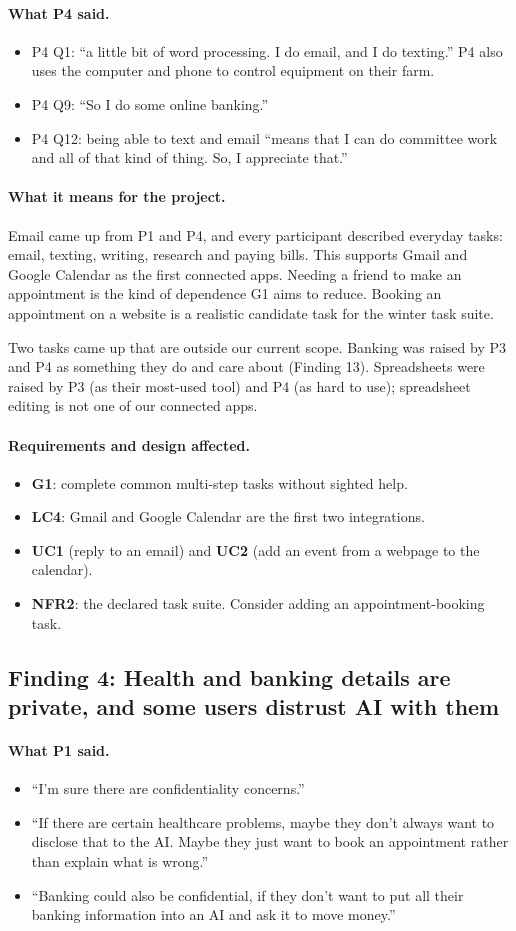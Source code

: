 \documentclass[12pt, titlepage]{article}
\newcommand{\said}{\paragraph{What P1 said.}}
\newcommand{\saidfour}{\paragraph{What P4 said.}}
\newcommand{\means}{\paragraph{What it means for the project.}}
\newcommand{\affects}{\paragraph{Requirements and design affected.}}
\begin{document}
\saidfour
\begin{itemize}
    \item P4 Q1: ``a little bit of word processing. I do email, and I do texting.'' P4 also uses the computer and phone to control equipment on their farm.
    \item P4 Q9: ``So I do some online banking.''
    \item P4 Q12: being able to text and email ``means that I can do committee work and all of that kind of thing. So, I appreciate that.''
\end{itemize}

\means
Email came up from P1 and P4, and every participant described everyday tasks: email, texting, writing, research and paying bills. This supports Gmail and Google Calendar as the first connected apps. Needing a friend to make an appointment is the kind of dependence G1 aims to reduce. Booking an appointment on a website is a realistic candidate task for the winter task suite.

Two tasks came up that are outside our current scope. Banking was raised by P3 and P4 as something they do and care about (Finding 13). Spreadsheets were raised by P3 (as their most-used tool) and P4 (as hard to use); spreadsheet editing is not one of our connected apps.

\affects
\begin{itemize}
    \item \textbf{G1}: complete common multi-step tasks without sighted help.
    \item \textbf{LC4}: Gmail and Google Calendar are the first two integrations.
    \item \textbf{UC1} (reply to an email) and \textbf{UC2} (add an event from a webpage to the calendar).
    \item \textbf{NFR2}: the declared task suite. Consider adding an appointment-booking task.
\end{itemize}

\subsection{Finding 4: Health and banking details are private, and some users distrust AI with them}

\said
\begin{itemize}
    \item ``I'm sure there are confidentiality concerns.''
    \item ``If there are certain healthcare problems, maybe they don't always want to disclose that to the AI. Maybe they just want to book an appointment rather than explain what is wrong.''
    \item ``Banking could also be confidential, if they don't want to put all their banking information into an AI and ask it to move money.''
\end{itemize}
\end{document}
